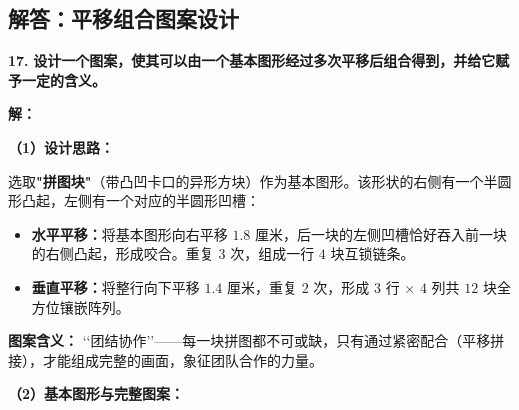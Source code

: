 ﻿%

\subsection{解答：平移组合图案设计}

\vspace{0.6cm}

\textbf{\LARGE 17.} \textbf{设计一个图案，使其可以由一个基本图形经过多次平移后组合得到，并给它赋予一定的含义。}

\vspace{0.4cm}
\textbf{解：}

\textbf{（1）设计思路：}

选取\textbf{"拼图块"}（带凸凹卡口的异形方块）作为基本图形。该形状的右侧有一个半圆形凸起，左侧有一个对应的半圆形凹槽：
\begin{itemize}
    \item \textbf{水平平移：}将基本图形向右平移 $1.8$ 厘米，后一块的左侧凹槽恰好吞入前一块的右侧凸起，形成咬合。重复 $3$ 次，组成一行 $4$ 块互锁链条。
    \item \textbf{垂直平移：}将整行向下平移 $1.4$ 厘米，重复 $2$ 次，形成 $3$ 行 $\times$ $4$ 列共 $12$ 块全方位镶嵌阵列。
\end{itemize}

\textbf{图案含义：} \lq \lq 团结协作\rq \rq ——每一块拼图都不可或缺，只有通过紧密配合（平移拼接），才能组成完整的画面，象征团队合作的力量。

\vspace{0.4cm}
\textbf{（2）基本图形与完整图案：}

